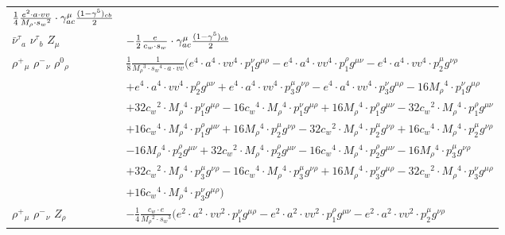 \begin{center}
\begin{tabular}{|l|l|}
	$\frac{1}{4}\frac{ e{}^2  \cdot a \cdot vv}{ M_{\rho} \cdot s_w{}^2 }\cdot \gamma_{a c}^\mu {(1-\gamma^5)_{c b}\over 2} $\\[2mm]
$\bar{\nu}^\tau{}_{a }$ \phantom{-} $\nu^\tau{}_{b }$ \phantom{-} ${Z}_{\mu }$ \phantom{-}  &
	$-\frac{1}{2}\frac{ e}{ c_w \cdot s_w}\cdot \gamma_{a c}^\mu {(1-\gamma^5)_{c b}\over 2} $\\[2mm]
$\rho^+{}_{\mu }$ \phantom{-} $\rho^-{}_{\nu }$ \phantom{-} $\rho^0{}_{\rho }$ \phantom{-}  &
	$\frac{1}{8}\frac{1}{ M_{\rho}{}^3  \cdot s_w{}^4  \cdot a \cdot vv}\big( e{}^4 \cdot  a{}^4 \cdot  vv{}^4 \cdot p_1^\nu g^{\mu \rho} - e{}^4 \cdot  a{}^4 \cdot  vv{}^4 \cdot p_1^\rho g^{\mu \nu} - e{}^4 \cdot  a{}^4 \cdot  vv{}^4 \cdot p_2^\mu g^{\nu \rho} $ \\[2mm]
  & $+ e{}^4 \cdot  a{}^4 \cdot  vv{}^4 \cdot p_2^\rho g^{\mu \nu} + e{}^4 \cdot  a{}^4 \cdot  vv{}^4 \cdot p_3^\mu g^{\nu \rho} - e{}^4 \cdot  a{}^4 \cdot  vv{}^4 \cdot p_3^\nu g^{\mu \rho} -16 M_{\rho}{}^4 \cdot p_1^\nu g^{\mu \rho} $ \\[2mm]
  & $+32 c_w{}^2 \cdot  M_{\rho}{}^4 \cdot p_1^\nu g^{\mu \rho} -16 c_w{}^4 \cdot  M_{\rho}{}^4 \cdot p_1^\nu g^{\mu \rho} +16 M_{\rho}{}^4 \cdot p_1^\rho g^{\mu \nu} -32 c_w{}^2 \cdot  M_{\rho}{}^4 \cdot p_1^\rho g^{\mu \nu} $ \\[2mm]
  & $+16 c_w{}^4 \cdot  M_{\rho}{}^4 \cdot p_1^\rho g^{\mu \nu} +16 M_{\rho}{}^4 \cdot p_2^\mu g^{\nu \rho} -32 c_w{}^2 \cdot  M_{\rho}{}^4 \cdot p_2^\mu g^{\nu \rho} +16 c_w{}^4 \cdot  M_{\rho}{}^4 \cdot p_2^\mu g^{\nu \rho} $ \\[2mm]
  & $-16 M_{\rho}{}^4 \cdot p_2^\rho g^{\mu \nu} +32 c_w{}^2 \cdot  M_{\rho}{}^4 \cdot p_2^\rho g^{\mu \nu} -16 c_w{}^4 \cdot  M_{\rho}{}^4 \cdot p_2^\rho g^{\mu \nu} -16 M_{\rho}{}^4 \cdot p_3^\mu g^{\nu \rho} $ \\[2mm]
  & $+32 c_w{}^2 \cdot  M_{\rho}{}^4 \cdot p_3^\mu g^{\nu \rho} -16 c_w{}^4 \cdot  M_{\rho}{}^4 \cdot p_3^\mu g^{\nu \rho} +16 M_{\rho}{}^4 \cdot p_3^\nu g^{\mu \rho} -32 c_w{}^2 \cdot  M_{\rho}{}^4 \cdot p_3^\nu g^{\mu \rho} $ \\[2mm]
  & $+16 c_w{}^4 \cdot  M_{\rho}{}^4 \cdot p_3^\nu g^{\mu \rho} \big)$\\[2mm]
$\rho^+{}_{\mu }$ \phantom{-} $\rho^-{}_{\nu }$ \phantom{-} ${Z}_{\rho }$ \phantom{-}  &
	$-\frac{1}{4}\frac{ c_w \cdot e}{ M_{\rho}{}^2  \cdot s_w{}^3 }\big( e{}^2 \cdot  a{}^2 \cdot  vv{}^2 \cdot p_1^\nu g^{\mu \rho} - e{}^2 \cdot  a{}^2 \cdot  vv{}^2 \cdot p_1^\rho g^{\mu \nu} - e{}^2 \cdot  a{}^2 \cdot  vv{}^2 \cdot p_2^\mu g^{\nu \rho} $ \\[2mm]

\end{tabular}
\end{center}
